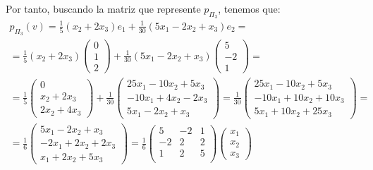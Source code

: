\begin{ejercicio}
\begin{enumerate}
\begin{enumerate}
        Por tanto, buscando la matriz que represente $p_{\Pi_3}$, tenemos que:
        \begin{multline*}
            p_{\Pi_3}(v)=\frac{1}{5}(x_2+2x_3)e_1 +\frac{1}{30}(5x_1-2x_2+x_3)e_2
            =\\=
            \frac{1}{5}(x_2+2x_3)\left(\begin{array}{c}
                 0 \\ 1 \\ 2
            \end{array}\right) +\frac{1}{30}(5x_1-2x_2+x_3) \left(\begin{array}{c}
                 5 \\ -2 \\ 1
            \end{array}\right)
            =\\=
            \frac{1}{5}\left(\begin{array}{c}
                 0 \\ x_2+2x_3 \\ 2x_2+4x_3
            \end{array}\right)
            + \frac{1}{30}\left(\begin{array}{c}
                 25x_1-10x_2+5x_3 \\ -10x_1+4x_2-2x_3 \\ 5x_1-2x_2+x_3
            \end{array}\right)
            = \frac{1}{30}\left(\begin{array}{c}
                 25x_1-10x_2+5x_3 \\ -10x_1+10x_2+10x_3 \\ 5x_1+10x_2+25x_3
            \end{array}\right) =\\
            = \frac{1}{6}\left(\begin{array}{c}
                 5x_1-2x_2+x_3 \\ -2x_1+2x_2+2x_3 \\ x_1+2x_2+5x_3
            \end{array}\right)
            =\frac{1}{6}\left(\begin{array}{ccc}
                 5 & -2 & 1 \\
                 -2 & 2 & 2 \\
                 1 & 2 & 5 \\
            \end{array}\right)\left(\begin{array}{c}
                 x_1 \\ x_2 \\ x_3
            \end{array}\right)
        \end{multline*}
        

\end{enumerate}
\end{enumerate}
\end{ejercicio}

